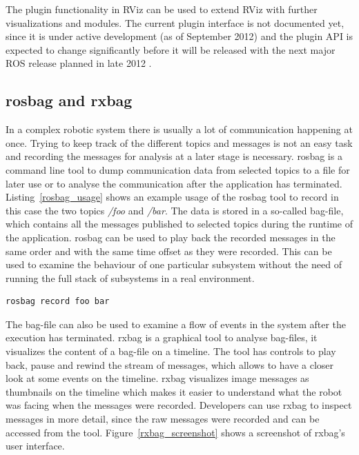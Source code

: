 The plugin functionality in RViz can be used to extend RViz with further visualizations and modules. The current plugin interface is not documented yet, since it is under active development (as of September 2012) and the plugin API is expected to change significantly before it will be released with the next major ROS release planned in late 2012 \cite{rvizPlugin}.

\subsection{rosbag and rxbag}
In a complex robotic system there is usually a lot of communication happening at once. Trying to keep track of the different topics and messages is not an easy task and recording the messages for analysis at a later stage is necessary. rosbag is a command line tool to dump communication data from selected topics to a file for later use or to analyse the communication after the application has terminated. Listing~\ref{rosbag_usage} shows an example usage of the rosbag tool to record in this case the two topics \emph{/foo} and \emph{/bar}. The data is stored in a so-called bag-file, which contains all the messages published to selected topics during the runtime of the application. rosbag can be used to play back the recorded messages in the same order and with the same time offset as they were recorded. This can be used to examine the behaviour of one particular subsystem without the need of running the full stack of subsystems in a real environment.

\begin{lstlisting}[frame=single,caption={Example usage of rosbag.},label=rosbag_usage]
rosbag record foo bar
\end{lstlisting}

The bag-file can also be used to examine a flow of events in the system after the execution has terminated. rxbag is a graphical tool to analyse bag-files, it visualizes the content of a bag-file on a timeline. The tool has controls to play back, pause and rewind the stream of messages, which allows to have a closer look at some events on the timeline. rxbag visualizes image messages as thumbnails on the timeline which makes it easier to understand what the robot was facing when the messages were recorded. Developers can use rxbag to inspect messages in more detail, since the raw messages were recorded and can be accessed from the tool. Figure~\ref{rxbag_screenshot} shows a screenshot of rxbag's user interface.

